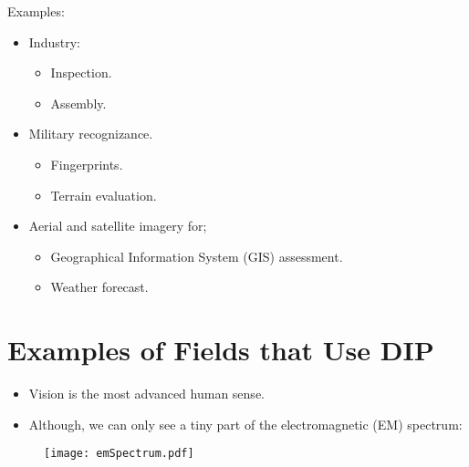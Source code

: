 
\begin{frame}
Examples:
	\begin{itemize}
		\item Industry:
			\begin{itemize}
			\item Inspection.
			\item Assembly.
			\end{itemize}
		\item Military recognizance.
			\begin{itemize}
			\item Fingerprints.
			\item Terrain evaluation.
			\end{itemize}
		\item Aerial and satellite imagery for;
			\begin{itemize}
			\item Geographical Information System (GIS) assessment.
			\item Weather forecast.
			\end{itemize}
	\end{itemize}
\end{frame}


\section{Examples of Fields that Use DIP}


\begin{frame}
\begin{itemize}
\item Vision is the most advanced human sense.
\item Although, we can only see a tiny part of the electromagnetic (EM) spectrum:
\end{itemize}
\begin{figure}
\texttt{[image: emSpectrum.pdf]}
\end{figure}
\end{frame}


